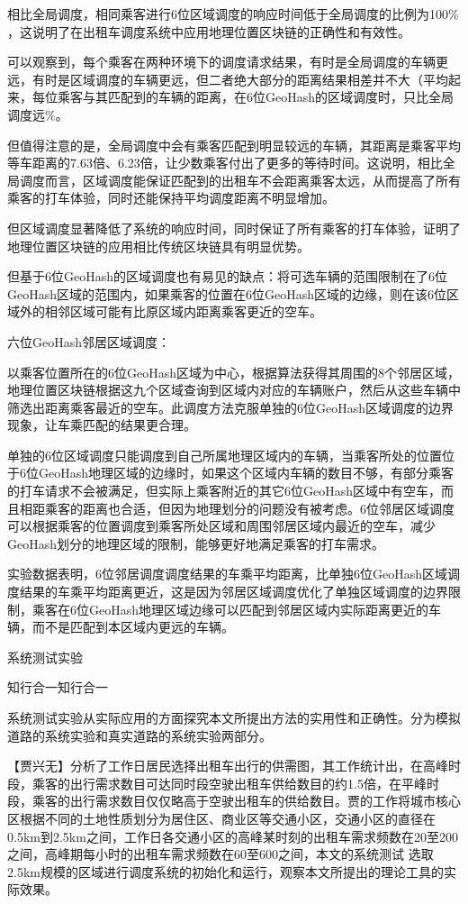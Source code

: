   相比全局调度，相同乘客进行6位区域调度的响应时间低于全局调度的比例为100$\%$，这说明了在出租车调度系统中应用地理位置区块链的正确性和有效性。

  可以观察到，每个乘客在两种环境下的调度请求结果，有时是全局调度的车辆更远，有时是区域调度的车辆更远，但二者绝大部分的距离结果相差并不大（平均起来，每位乘客与其匹配到的车辆的距离，在6位GeoHash的区域调度时，只比全局调度远$\%$。

  但值得注意的是，全局调度中会有乘客匹配到明显较远的车辆，其距离是乘客平均等车距离的7.63倍、6.23倍，让少数乘客付出了更多的等待时间。这说明，相比全局调度而言，区域调度能保证匹配到的出租车不会距离乘客太远，从而提高了所有乘客的打车体验，同时还能保持平均调度距离不明显增加。

  但区域调度显著降低了系统的响应时间，同时保证了所有乘客的打车体验，证明了地理位置区块链的应用相比传统区块链具有明显优势。

  但基于6位GeoHash的区域调度也有易见的缺点：将可选车辆的范围限制在了6位GeoHash区域的范围内，如果乘客的位置在6位GeoHash区域的边缘，则在该6位区域外的相邻区域可能有比原区域内距离乘客更近的空车。

  六位GeoHash邻居区域调度：

  以乘客位置所在的6位GeoHash区域为中心，根据算法获得其周围的8个邻居区域，地理位置区块链根据这九个区域查询到区域内对应的车辆账户，然后从这些车辆中筛选出距离乘客最近的空车。此调度方法克服单独的6位GeoHash区域调度的边界现象，让车乘匹配的结果更合理。

  单独的6位区域调度只能调度到自己所属地理区域内的车辆，当乘客所处的位置位于6位GeoHash地理区域的边缘时，如果这个区域内车辆的数目不够，有部分乘客的打车请求不会被满足，但实际上乘客附近的其它6位GeoHash区域中有空车，而且相距乘客的距离也合适，但因为地理划分的问题没有被考虑。6位邻居区域调度可以根据乘客的位置调度到乘客所处区域和周围邻居区域内最近的空车，减少GeoHash划分的地理区域的限制，能够更好地满足乘客的打车需求。

实验数据表明，6位邻居调度调度结果的车乘平均距离，比单独6位GeoHash区域调度结果的车乘平均距离更近，这是因为邻居区域调度优化了单独区域调度的边界限制，乘客在6位GeoHash地理区域边缘可以匹配到邻居区域内实际距离更近的车辆，而不是匹配到本区域内更远的车辆。



系统测试实验

知行合一知行合一

系统测试实验从实际应用的方面探究本文所提出方法的实用性和正确性。分为模拟道路的系统实验和真实道路的系统实验两部分。

【贾兴无】分析了工作日居民选择出租车出行的供需图，其工作统计出，在高峰时段，乘客的出行需求数目可达同时段空驶出租车供给数目的约1.5倍，在平峰时段，乘客的出行需求数目仅仅略高于空驶出租车的供给数目。贾的工作将城市核心区根据不同的土地性质划分为居住区、商业区等交通小区，交通小区的直径在0.5km到2.5km之间，工作日各交通小区的高峰某时刻的出租车需求频数在20至200之间，高峰期每小时的出租车需求频数在60至600之间，本文的系统测试
选取2.5km规模的区域进行调度系统的初始化和运行，观察本文所提出的理论工具的实际效果。

